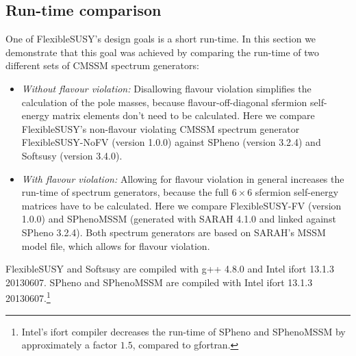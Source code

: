 \documentclass[final,3p,11pt,pdflatex]{elsarticle}
\makeatletter
\newcommand{\fs}{FlexibleSUSY\@\xspace}
\makeatother
\begin{document}
\subsection{Run-time comparison}
\label{sec:run-time comparison}

One of \fs's design goals is a short run-time.  In this section we
demonstrate that this goal was achieved by comparing the run-time of
two different sets of CMSSM spectrum generators:
%
\begin{itemize}
\item \emph{Without flavour violation:} Disallowing flavour violation
  simplifies the calculation of the pole masses, because
  flavour-off-diagonal sfermion self-energy matrix elements don't need
  to be calculated.  Here we compare \fs's non-flavour violating CMSSM
  spectrum generator FlexibleSUSY-NoFV (version 1.0.0) against SPheno
  (version 3.2.4) and Softsusy (version 3.4.0).
%
\item \emph{With flavour violation:} Allowing for flavour violation in
  general increases the run-time of spectrum generators, because the
  full $6\times 6$ sfermion self-energy matrices have to be
  calculated.  Here we compare FlexibleSUSY-FV (version 1.0.0) and
  SPhenoMSSM (generated with SARAH 4.1.0 and linked against SPheno
  3.2.4).  Both spectrum generators are based on SARAH's MSSM model
  file, which allows for flavour violation.
\end{itemize}
%
\fs and Softsusy are compiled with g++ 4.8.0 and Intel ifort
13.1.3 20130607.  SPheno and SPhenoMSSM are compiled with Intel ifort
13.1.3 20130607.\footnote{Intel's ifort compiler decreases the
  run-time of SPheno and SPhenoMSSM by approximately a factor $1.5$,
  compared to gfortran.}
\end{document}
